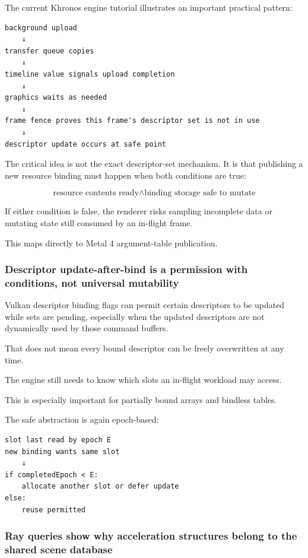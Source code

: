 The current Khronos engine tutorial illustrates an important practical pattern:

\begin{verbatim}
background upload
    ↓
transfer queue copies
    ↓
timeline value signals upload completion
    ↓
graphics waits as needed
    ↓
frame fence proves this frame's descriptor set is not in use
    ↓
descriptor update occurs at safe point
\end{verbatim}

The critical idea is not the exact descriptor-set mechanism. It is that publishing a new resource binding must happen when both conditions are true:

\[
\boxed{
\text{resource contents ready}
\land
\text{binding storage safe to mutate}
}
\]

If either condition is false, the renderer risks sampling incomplete data or mutating state still consumed by an in-flight frame.

This maps directly to Metal 4 argument-table publication.

\subsubsection{Descriptor update-after-bind is a permission with conditions, not universal mutability}\label{05-engine-i-ch023-descriptor-update-after-bind-is-a-permission-with-conditions-not-universal-mutability}

Vulkan descriptor binding flags can permit certain descriptors to be updated while sets are pending, especially when the updated descriptors are not dynamically used by those command buffers.

That does not mean every bound descriptor can be freely overwritten at any time.

The engine still needs to know which slots an in-flight workload may access.

This is especially important for partially bound arrays and bindless tables.

The safe abstraction is again epoch-based:

\begin{verbatim}
slot last read by epoch E
new binding wants same slot
    ↓
if completedEpoch < E:
    allocate another slot or defer update
else:
    reuse permitted
\end{verbatim}

\subsubsection{Ray queries show why acceleration structures belong to the shared scene database}\label{05-engine-i-ch023-ray-queries-show-why-acceleration-structures-belong-to-the-shared-scene-database}

